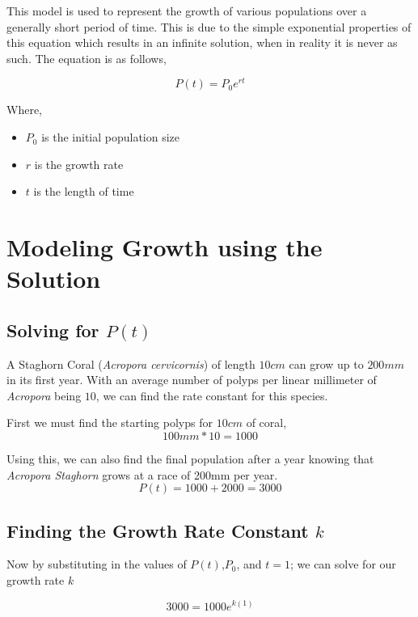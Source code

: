 \documentclass[12pt]{article}
\begin{document}
	This model is used to represent the growth of various populations over a generally short period of time. This is due to the simple exponential properties of this equation which results in an infinite solution, when in reality it is never as such.\cite{wiki:Equation} The equation is as follows,
	
	\begin{equation}
		P(t)= P_{0}e^{rt}
	\end{equation}
	
	Where,
	\begin{itemize}
		\item $P_{0}$ is the initial population size
		\item $r$ is the growth rate
		\item $t$ is the length of time
	\end{itemize}

	\section{Modeling Growth using the Solution}
	\subsection{Solving for $P(t)$}
	A Staghorn Coral (\textit{Acropora cervicornis}) of length $10cm$ can grow up to $200mm$ in its first year. With an average number of polyps per linear millimeter of \textit{Acropora} being $10$, we can find the rate constant for this species.\cite{AcroStats}
	
	First we must find the starting polyps for $10cm$ of coral,
	\begin{equation}
		100mm*10=1000
	\end{equation}
	
	Using this, we can also find the final population after a year knowing that \textit{Acropora Staghorn} grows at a race of 200mm per year.
	\begin{equation}
		P(t)=1000+2000=3000
	\end{equation}
	
	\subsection{Finding the Growth Rate Constant $k$}
	Now by substituting in the values of $P(t)$,$P_{0}$, and $t=1$; we can solve for our growth rate $k$
	
	\begin{equation}
		3000 = 1000e^{k(1)}
	\end{equation}
	
\end{document}

